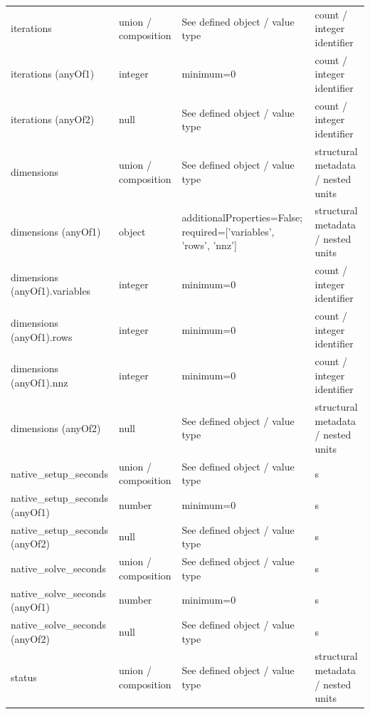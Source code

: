 \begin{longtable}{@{}>{\raggedright\arraybackslash}p{}>{\raggedright\arraybackslash}p{}>{\raggedright\arraybackslash}p{}>{\raggedright\arraybackslash}p{}@{}}
iterations & union /\allowbreak{} composition & See defined object /\allowbreak{} value type & count /\allowbreak{} integer identifier\\
iterations (anyOf1) & integer & minimum=\allowbreak{}0 & count /\allowbreak{} integer identifier\\
iterations (anyOf2) & null & See defined object /\allowbreak{} value type & count /\allowbreak{} integer identifier\\
dimensions & union /\allowbreak{} composition & See defined object /\allowbreak{} value type & structural metadata /\allowbreak{} nested units\\
dimensions (anyOf1) & object & additionalProperties=\allowbreak{}False; required=\allowbreak{}['variables', 'rows', 'nnz'] & structural metadata /\allowbreak{} nested units\\
dimensions (anyOf1).\allowbreak{}variables & integer & minimum=\allowbreak{}0 & count /\allowbreak{} integer identifier\\
dimensions (anyOf1).\allowbreak{}rows & integer & minimum=\allowbreak{}0 & count /\allowbreak{} integer identifier\\
dimensions (anyOf1).\allowbreak{}nnz & integer & minimum=\allowbreak{}0 & count /\allowbreak{} integer identifier\\
dimensions (anyOf2) & null & See defined object /\allowbreak{} value type & structural metadata /\allowbreak{} nested units\\
native\_\allowbreak{}setup\_\allowbreak{}seconds & union /\allowbreak{} composition & See defined object /\allowbreak{} value type & s\\
native\_\allowbreak{}setup\_\allowbreak{}seconds (anyOf1) & number & minimum=\allowbreak{}0 & s\\
native\_\allowbreak{}setup\_\allowbreak{}seconds (anyOf2) & null & See defined object /\allowbreak{} value type & s\\
native\_\allowbreak{}solve\_\allowbreak{}seconds & union /\allowbreak{} composition & See defined object /\allowbreak{} value type & s\\
native\_\allowbreak{}solve\_\allowbreak{}seconds (anyOf1) & number & minimum=\allowbreak{}0 & s\\
native\_\allowbreak{}solve\_\allowbreak{}seconds (anyOf2) & null & See defined object /\allowbreak{} value type & s\\
status & union /\allowbreak{} composition & See defined object /\allowbreak{} value type & structural metadata /\allowbreak{} nested units\\

\end{longtable}

